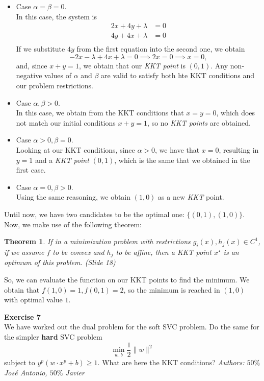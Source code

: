 \documentclass[11pt,table]{article}
\newtheorem{nth}{Theorem}
\newenvironment{problem}[2][Exercise]
{ \begin{mdframed}[backgroundcolor=gray!20] \textbf{#1 #2} \\}
	{\hspace{0.0cm}\newline\newline \emph{Authors: \(50\%\) José Antonio, \(50\%\) Javier}  \end{mdframed}}
\newcommand\norm[1]{\lVert#1\rVert}
\begin{document}
\begin{itemize}
	\item Case \(\alpha = \beta = 0\).\\
	      In this case, the system is
	      \begin{align*}
		      2x + 4y + \lambda & = 0 \\
		      4y + 4x + \lambda & = 0 \\
	      \end{align*}
	      If we substitute \(4y\) from the first equation into the second one, we obtain
	      \[
		      -2x - \lambda + 4x + \lambda = 0 \implies 2x = 0  \implies x = 0,
	      \]
	      and, since \(x+y = 1\), we obtain that our \emph{KKT point} is \((0,1)\). Any non-negative values of $\alpha$ and $\beta$ are valid to satisfy both hte KKT conditions and our problem restrictions.
	\item Case \(\alpha, \beta > 0\).\\
	      In this case, we obtain from the KKT conditions that \(x=  y = 0\), which does not match our initial conditions \(x+y = 1\), so no \emph{KKT points} are obtained.
	\item Case \(\alpha > 0, \beta = 0\).\\
	      Looking at our KKT conditions, since \(\alpha > 0\), we have that \(x = 0\), resulting in \(y=1\) and a \emph{KKT point} \((0,1)\), which is the same that we obtained in the first case.\\
	\item Case \(\alpha = 0, \beta > 0\).\\
	      Using the same reasoning, we obtain \((1,0)\) as a new \emph{KKT} point.
\end{itemize}

Until now, we have two candidates to be the optimal one: \(\{(0,1),(1,0)\}\). Now, we make use of the following theorem:

\begin{nth}
	If in a minimization problem with restrictions \(g_i(x), h_j(x) \in C^1\), if we assume \(f\) to be convex and \(h_j\) to be affine, then a KKT point \(x^\star\) is an optimum of this problem. (Slide 18)
\end{nth}

So, we can evaluate the function on our KKT points to find the minimum. We obtain that \(f(1,0) = 1, f(0,1) = 2\), so the minimum is reached in \((1,0)\) with optimal value \(1\). \\

\begin{problem}{7}
We have worked out the dual problem for the soft SVC problem. Do the same for the simpler \textbf{hard} SVC problem
\[
	\min_{w,b} \frac{1}{2} \norm{w}^2
\]
subject to \(y^p\left(w \cdot x^p + b\right) \geq 1\). What are here the KKT conditions?
\end{problem}
\end{document}
